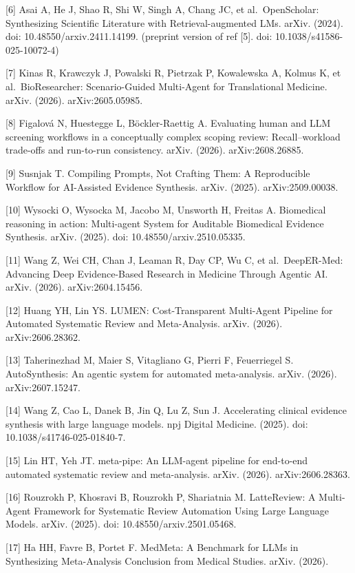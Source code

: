 \documentclass[11pt]{article}
\begin{document}
{[}6{]} Asai A, He J, Shao R, Shi W, Singh A, Chang JC, et
al.~OpenScholar: Synthesizing Scientific Literature with
Retrieval-augmented LMs. arXiv. (2024). doi: 10.48550/arxiv.2411.14199.
(preprint version of ref {[}5{]}. doi: 10.1038/s41586-025-10072-4)

{[}7{]} Kinas R, Krawczyk J, Powalski R, Pietrzak P, Kowalewska A,
Kolmus K, et al.~BioResearcher: Scenario-Guided Multi-Agent for
Translational Medicine. arXiv. (2026). arXiv:2605.05985.

{[}8{]} Figalová N, Huestegge L, Böckler-Raettig A. Evaluating human and
LLM screening workflows in a conceptually complex scoping review:
Recall--workload trade-offs and run-to-run consistency. arXiv. (2026).
arXiv:2608.26885.

{[}9{]} Susnjak T. Compiling Prompts, Not Crafting Them: A Reproducible
Workflow for AI-Assisted Evidence Synthesis. arXiv. (2025).
arXiv:2509.00038.

{[}10{]} Wysocki O, Wysocka M, Jacobo M, Unsworth H, Freitas A.
Biomedical reasoning in action: Multi-agent System for Auditable
Biomedical Evidence Synthesis. arXiv. (2025). doi:
10.48550/arxiv.2510.05335.

{[}11{]} Wang Z, Wei CH, Chan J, Leaman R, Day CP, Wu C, et
al.~DeepER-Med: Advancing Deep Evidence-Based Research in Medicine
Through Agentic AI. arXiv. (2026). arXiv:2604.15456.

{[}12{]} Huang YH, Lin YS. LUMEN: Cost-Transparent Multi-Agent Pipeline
for Automated Systematic Review and Meta-Analysis. arXiv. (2026).
arXiv:2606.28362.

{[}13{]} Taherinezhad M, Maier S, Vitagliano G, Pierri F, Feuerriegel S.
AutoSynthesis: An agentic system for automated meta-analysis. arXiv.
(2026). arXiv:2607.15247.

{[}14{]} Wang Z, Cao L, Danek B, Jin Q, Lu Z, Sun J. Accelerating
clinical evidence synthesis with large language models. npj Digital
Medicine. (2025). doi: 10.1038/s41746-025-01840-7.

{[}15{]} Lin HT, Yeh JT. meta-pipe: An LLM-agent pipeline for end-to-end
automated systematic review and meta-analysis. arXiv. (2026).
arXiv:2606.28363.

{[}16{]} Rouzrokh P, Khosravi B, Rouzrokh P, Shariatnia M. LatteReview:
A Multi-Agent Framework for Systematic Review Automation Using Large
Language Models. arXiv. (2025). doi: 10.48550/arxiv.2501.05468.

{[}17{]} Ha HH, Favre B, Portet F. MedMeta: A Benchmark for LLMs in
Synthesizing Meta-Analysis Conclusion from Medical Studies. arXiv.
(2026).
\end{document}
